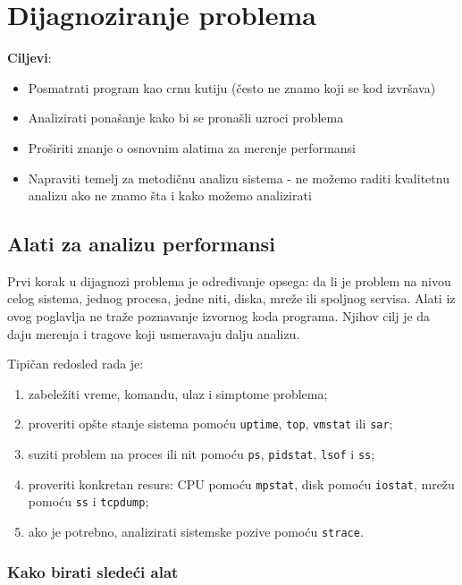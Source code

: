 \section{Dijagnoziranje problema}\label{dijagnoziranje-problema}

\textbf{Ciljevi}:

\begin{itemize}
\tightlist
\item
  Posmatrati program kao crnu kutiju (često ne znamo koji se kod izvršava)
\item
  Analizirati ponašanje kako bi se pronašli uzroci problema
\item
  Proširiti znanje o osnovnim alatima za merenje performansi
\item
  Napraviti temelj za metodičnu analizu sistema - ne možemo raditi kvalitetnu analizu ako ne znamo šta i kako možemo analizirati
\end{itemize}

\subsection{Alati za analizu performansi}\label{alati-za-analizu-performansi}

Prvi korak u dijagnozi problema je određivanje opsega: da li je problem na nivou celog sistema, jednog procesa, jedne niti, diska, mreže ili spoljnog servisa. Alati iz ovog poglavlja ne traže poznavanje izvornog koda programa. Njihov cilj je da daju merenja i tragove koji usmeravaju dalju analizu.

Tipičan redosled rada je:

\begin{enumerate}
\tightlist
\item
  zabeležiti vreme, komandu, ulaz i simptome problema;
\item
  proveriti opšte stanje sistema pomoću \texttt{uptime}, \texttt{top}, \texttt{vmstat} ili \texttt{sar};
\item
  suziti problem na proces ili nit pomoću \texttt{ps}, \texttt{pidstat}, \texttt{lsof} i \texttt{ss};
\item
  proveriti konkretan resurs: CPU pomoću \texttt{mpstat}, disk pomoću \texttt{iostat}, mrežu pomoću \texttt{ss} i \texttt{tcpdump};
\item
  ako je potrebno, analizirati sistemske pozive pomoću \texttt{strace}.
\end{enumerate}

\subsubsection{Kako birati sledeći alat}\label{dijagnoziranje-izbor-alata}

